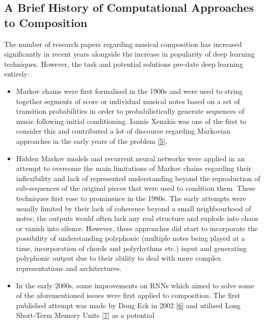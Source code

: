 \documentclass[12pt,]{article}
\providecommand{\tightlist}{%
  \setlength{\itemsep}{0pt}\setlength{\parskip}{0pt}}
\begin{document}
\hypertarget{a-brief-history-of-computational-approaches-to-composition}{%
\subsection{A Brief History of Computational Approaches to
Composition}\label{a-brief-history-of-computational-approaches-to-composition}}

The number of research papers regarding musical composition has
increased significantly in recent years alongside the increase in
popularity of deep learning techniques. However, the task and potential
solutions pre-date deep learning entirely:

\begin{itemize}
\tightlist
\item
  Markov chains were first formalised in the 1900s and were used to
  string together segments of score or individual musical notes based on
  a set of transition probabilities in order to probabilistically
  generate sequences of music following initial conditioning. Iannis
  Xenakis was one of the first to consider this and contributed a lot of
  discourse regarding Markovian approaches in the early years of the
  problem {[}\protect\hyperlink{ref-luque2009stochastic}{5}{]}.
\item
  Hidden Markov models and recurrent neural networks were applied in an
  attempt to overcome the main limitations of Markov chains regarding
  their inflexibility and lack of represented understanding beyond the
  reproduction of sub-sequences of the original pieces that were used to
  condition them. These techniques first rose to prominence in the
  1980s. The early attempts were usually limited by their lack of
  coherence beyond a small neighbourhood of notes; the outputs would
  often lack any real structure and explode into chaos or vanish into
  silence. However, these approaches did start to incorporate the
  possibility of understanding polyphonic (multiple notes being played
  at a time, incorporation of chords and polyrhythms etc.) input and
  generating polyphonic output due to their ability to deal with more
  complex representations and architectures.
\item
  In the early 2000s, some improvements on RNNs which aimed to solve
  some of the aforementioned issues were first applied to composition.
  The first published attempt was made by Doug Eck in 2002
  {[}\protect\hyperlink{ref-eck2002finding}{6}{]} and utilised Long
  Short-Term Memory Units
  {[}\protect\hyperlink{ref-gers1999learning}{7}{]} as a potential

\end{itemize}
\end{document}
